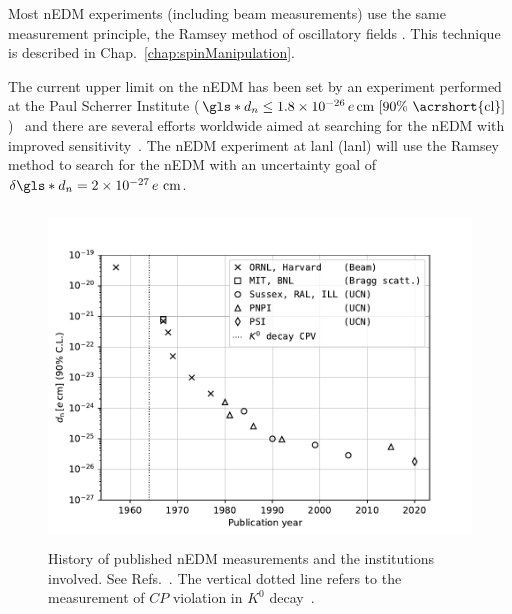 Most nEDM experiments (including beam measurements) use the same measurement principle, the Ramsey method of oscillatory fields \cite{ramsey_molecular_1950}. This technique is described in Chap.~\ref{chap:spinManipulation}. 

The current upper limit on the nEDM has been set by an experiment performed at the Paul Scherrer Institute ($\gls*{d_n}\leq \num{1.8e-26}\,e\,\text{cm [90\% \acrshort{cl}]}$)~\cite{ABE20} and there are several efforts worldwide aimed at searching for the nEDM with improved sensitivity~\cite{Alarcon2022}. The nEDM experiment at \acrlong*{lanl} (\acrshort*{lanl}) will use the Ramsey method to search for the nEDM with an uncertainty goal of $\delta \gls*{d_n} = \num{2e-27}\,e\text{ cm}$.

\begin{figure}
    \centering
    \includegraphics[height=3.5in]{figures/nEDM-history.pdf}
    \caption[History of published nEDM measurements and the institutions involved.]{History of published nEDM measurements and the institutions involved. See Refs.~\cite{ramsey_nedm_1950, ramsey_nedm_1957, miller_nedm_1967, shull_nedm_1967, dress_nedm_1968, cohen_nedm_1969, dress_nedm_1973, dress_nedm_1977, altarev_nedm_1980, altarev_nedm_1981, pendlebury_nedm_1984,
    altarev_nedm_1986, smith_nedm_1990, altarev_nedm_1992, altarev_nedm_1996, harris_nedm_1999, BAK06, ABE20, pnpi_nedm_2015}. The vertical dotted line refers to the measurement of $CP$ violation in $K^0$ decay~\cite{christenson_1964}.}
    \label{fig:nEDM-history}
\end{figure}